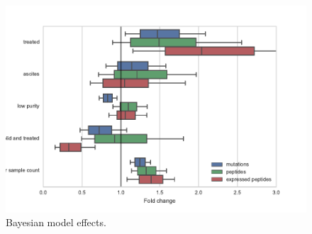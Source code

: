 \begin{figure}[h]
\centering
\includegraphics[scale=0.5]{figures/bayesian_model_effects.pdf}
\caption{Bayesian model effects. }
\label{fig:bayesian}
\end{figure}

